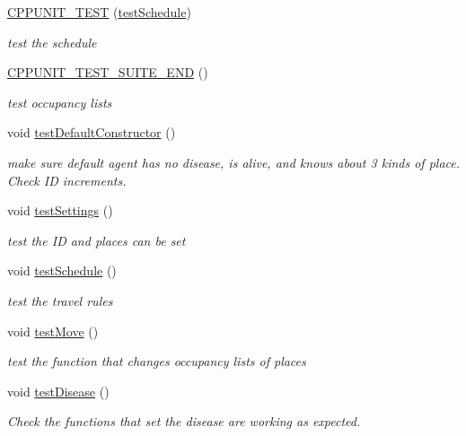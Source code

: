 \begin{DoxyCompactItemize}
\mbox{\label{classagentTest_a6558275101998971b56abdd2a323623d}} 
\mbox{\hyperlink{classagentTest_a6558275101998971b56abdd2a323623d}{C\+P\+P\+U\+N\+I\+T\+\_\+\+T\+E\+ST}} (\mbox{\hyperlink{classagentTest_adaa25e2c092be46311aea330d19d7f94}{test\+Schedule}})
\begin{DoxyCompactList}\small\item\em test the schedule \end{DoxyCompactList}\item 
\mbox{\hyperlink{classagentTest_a51ff7b623cb89bce6fa8bab5f8af04b7}{C\+P\+P\+U\+N\+I\+T\+\_\+\+T\+E\+S\+T\+\_\+\+S\+U\+I\+T\+E\+\_\+\+E\+ND}} ()
\begin{DoxyCompactList}\small\item\em test occupancy lists \end{DoxyCompactList}\item 
void \mbox{\hyperlink{classagentTest_ade6fc2895d439529b21d4fb725302b77}{test\+Default\+Constructor}} ()
\begin{DoxyCompactList}\small\item\em make sure default agent has no disease, is alive, and knows about 3 kinds of place. Check ID increments. \end{DoxyCompactList}\item 
\mbox{\label{classagentTest_ad39e9d21138b56f55a29ced6fdba8e58}} 
void \mbox{\hyperlink{classagentTest_ad39e9d21138b56f55a29ced6fdba8e58}{test\+Settings}} ()
\begin{DoxyCompactList}\small\item\em test the ID and places can be set \end{DoxyCompactList}\item 
void \mbox{\hyperlink{classagentTest_adaa25e2c092be46311aea330d19d7f94}{test\+Schedule}} ()
\begin{DoxyCompactList}\small\item\em test the travel rules \end{DoxyCompactList}\item 
\mbox{\label{classagentTest_a7207d3076716ba24d42ebac5b97a6f6e}} 
void \mbox{\hyperlink{classagentTest_a7207d3076716ba24d42ebac5b97a6f6e}{test\+Move}} ()
\begin{DoxyCompactList}\small\item\em test the function that changes occupancy lists of places \end{DoxyCompactList}\item 
\mbox{\label{classagentTest_a628c4b06eee5b0e6e7a45c842ed70429}} 
void \mbox{\hyperlink{classagentTest_a628c4b06eee5b0e6e7a45c842ed70429}{test\+Disease}} ()
\begin{DoxyCompactList}\small\item\em Check the functions that set the disease are working as expected. \end{DoxyCompactList}\end{DoxyCompactItemize}


